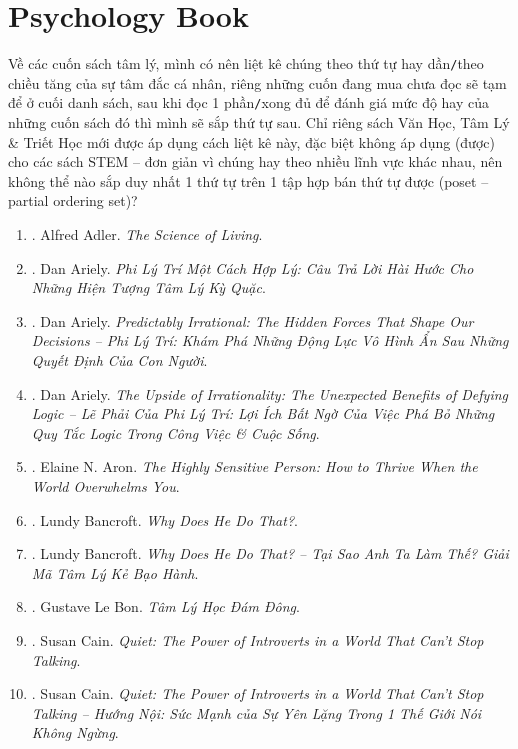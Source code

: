 \documentclass{article}
\begin{document}
\section{Psychology Book}
Về các cuốn sách tâm lý, mình có nên liệt kê chúng theo thứ tự hay dần\texttt{/}theo chiều tăng của sự tâm đắc cá nhân, riêng những cuốn đang mua chưa đọc sẽ tạm để ở cuối danh sách, sau khi đọc 1 phần\texttt{/}xong đủ để đánh giá mức độ hay của những cuốn sách đó thì mình sẽ sắp thứ tự sau. Chỉ riêng sách Văn Học, Tâm Lý \& Triết Học mới được áp dụng cách liệt kê này, đặc biệt không áp dụng (được) cho các sách STEM -- đơn giản vì chúng hay theo nhiều lĩnh vực khác nhau, nên không thể nào sắp duy nhất 1 thứ tự trên 1 tập hợp bán thứ tự được (poset -- partial ordering set)?
\begin{enumerate}
	\item \cite{Adler2013}. Alfred Adler. \textit{The Science of Living}.\hfill{\sf[finished]}
	\item \cite{Ariely_reasonably_irrational}. Dan Ariely. \textit{Phi Lý Trí Một Cách Hợp Lý: Câu Trả Lời Hài Hước Cho Những Hiện Tượng Tâm Lý Kỳ Quặc}.\hfill{\sf[finished]}
	\item \cite{Ariely_predictably_irrational}. Dan Ariely. \textit{Predictably Irrational: The Hidden Forces That Shape Our Decisions -- Phi Lý Trí: Khám Phá Những Động Lực Vô Hình Ẩn Sau Những Quyết Định Của Con Người}.\hfill{\sf[finished]}
	\item \cite{Ariely_upside_rationality}. Dan Ariely. \textit{The Upside of Irrationality: The Unexpected Benefits of Defying Logic -- Lẽ Phải Của Phi Lý Trí: Lợi Ích Bất Ngờ Của Việc Phá Bỏ Những Quy Tắc Logic Trong Công Việc \& Cuộc Sống}.\hfill{\sf[finished]}
	\item \cite{Aron2013}. Elaine N. Aron. \textit{The Highly Sensitive Person: How to Thrive When the World Overwhelms You}.\hfill{\sf[finished]}
	\item \cite{Bancroft2003}. Lundy Bancroft. \textit{Why Does He Do That?}.\hfill{\sf[reading]}
	\item \cite{Bancroft2019}. Lundy Bancroft. \textit{Why Does He Do That? -- Tại Sao Anh Ta Làm Thế? Giải Mã Tâm Lý Kẻ Bạo Hành}.\hfill{\sf[finished]}
	\item \cite{Bon2022}. Gustave Le Bon. \textit{Tâm Lý Học Đám Đông}.\hfill{\sf[finished]}
	\item \cite{Cain2013}. Susan Cain. \textit{Quiet: The Power of Introverts in a World That Can't Stop Talking}.\hfill{\sf[reading]}
	\item \cite{Cain2022}. Susan Cain. \textit{Quiet: The Power of Introverts in a World That Can't Stop Talking -- Hướng Nội: Sức Mạnh của Sự Yên Lặng Trong 1 Thế Giới Nói Không Ngừng}.\hfill{\sf[finished]}

\end{enumerate}
\end{document}
